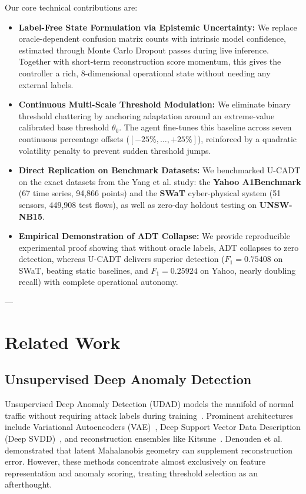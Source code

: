 \documentclass[conference]{IEEEtran}
\begin{document}
Our core technical contributions are:
\begin{itemize}
    \item \textbf{Label-Free State Formulation via Epistemic Uncertainty:} We replace oracle-dependent confusion matrix counts with intrinsic model confidence, estimated through Monte Carlo Dropout passes during live inference. Together with short-term reconstruction score momentum, this gives the controller a rich, 8-dimensional operational state without needing any external labels.
    \item \textbf{Continuous Multi-Scale Threshold Modulation:} We eliminate binary threshold chattering by anchoring adaptation around an extreme-value calibrated base threshold $\theta_0$. The agent fine-tunes this baseline across seven continuous percentage offsets ($[-25\%, \dots, +25\%]$), reinforced by a quadratic volatility penalty to prevent sudden threshold jumps.
    \item \textbf{Direct Replication on Benchmark Datasets:} We benchmarked U-CADT on the exact datasets from the Yang et al. study: the \textbf{Yahoo A1Benchmark} (67 time series, 94,866 points) and the \textbf{SWaT} cyber-physical system (51 sensors, 449,908 test flows), as well as zero-day holdout testing on \textbf{UNSW-NB15}.
    \item \textbf{Empirical Demonstration of ADT Collapse:} We provide reproducible experimental proof showing that without oracle labels, ADT collapses to zero detection, whereas U-CADT delivers superior detection ($F_1 = 0.75408$ on SWaT, beating static baselines, and $F_1 = 0.25924$ on Yahoo, nearly doubling recall) with complete operational autonomy.
\end{itemize}

---

\section{Related Work}

\subsection{Unsupervised Deep Anomaly Detection}
Unsupervised Deep Anomaly Detection (UDAD) models the manifold of normal traffic without requiring attack labels during training~\cite{chalapathy2019deep}. Prominent architectures include Variational Autoencoders (VAE)~\cite{xu2018unsupervised}, Deep Support Vector Data Description (Deep SVDD)~\cite{ruff2018deep}, and reconstruction ensembles like Kitsune~\cite{mirsky2018kitsune}. Denouden et al.~\cite{denouden2018improving} demonstrated that latent Mahalanobis geometry can supplement reconstruction error. However, these methods concentrate almost exclusively on feature representation and anomaly scoring, treating threshold selection as an afterthought.
\end{document}
